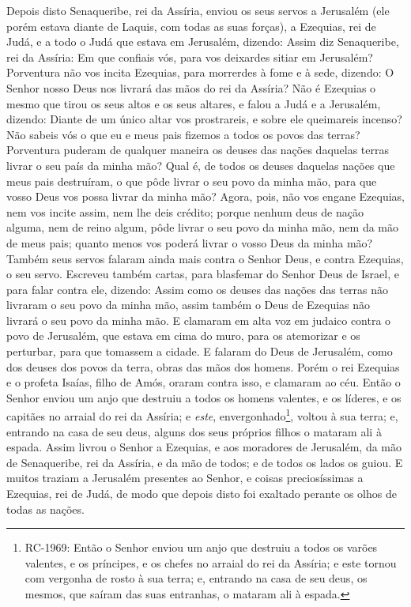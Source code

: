 Depois disto Senaqueribe, rei da Assíria, enviou os seus servos a
Jerusalém (ele porém estava diante de Laquis, com todas as suas
forças), a Ezequias, rei de Judá, e a todo o Judá que estava em
Jerusalém, dizendo: Assim diz Senaqueribe, rei da Assíria: Em
que confiais vós, para vos deixardes sitiar em Jerusalém?
Porventura não vos incita Ezequias, para morrerdes à fome e à
sede, dizendo: O Senhor nosso Deus nos livrará das mãos do rei da
Assíria? Não é Ezequias o mesmo que tirou os seus altos e os
seus altares, e falou a Judá e a Jerusalém, dizendo: Diante de um
único altar vos prostrareis, e sobre ele queimareis incenso?
Não sabeis vós o que eu e meus pais fizemos a todos os povos
das terras? Porventura puderam de qualquer maneira os deuses das
nações daquelas terras livrar o seu país da minha mão? Qual
é, de todos os deuses daquelas nações que meus pais destruíram, o
que pôde livrar o seu povo da minha mão, para que vosso Deus vos
possa livrar da minha mão? Agora, pois, não vos engane
Ezequias, nem vos incite assim, nem lhe deis crédito; porque nenhum
deus de nação alguma, nem de reino algum, pôde livrar o seu povo da
minha mão, nem da mão de meus pais; quanto menos vos poderá livrar o
vosso Deus da minha mão? Também seus servos falaram ainda
mais contra o Senhor Deus, e contra Ezequias, o seu servo.
Escreveu também cartas, para blasfemar do Senhor Deus de
Israel, e para falar contra ele, dizendo: Assim como os deuses das
nações das terras não livraram o seu povo da minha mão, assim também
o Deus de Ezequias não livrará o seu povo da minha mão. E
clamaram em alta voz em judaico contra o povo de Jerusalém, que
estava em cima do muro, para os atemorizar e os perturbar, para que
tomassem a cidade. E falaram do Deus de Jerusalém, como dos
deuses dos povos da terra, obras das mãos dos homens. Porém o
rei Ezequias e o profeta Isaías, filho de Amós, oraram contra isso,
e clamaram ao céu. Então o Senhor enviou um anjo que destruiu
a todos os homens valentes, e os líderes, e os capitães no arraial
do rei da Assíria; e \emph{este}, envergonhado\footnote{RC-1969:
Então o Senhor enviou um anjo que destruiu a todos os varões
valentes, e os príncipes, e os chefes no arraial do rei da Assíria;
e este tornou com vergonha de rosto à sua terra; e, entrando na casa
de seu deus, os mesmos, que saíram das suas entranhas, o mataram ali
à espada.}, voltou à sua terra; e, entrando na casa de seu deus,
alguns dos seus próprios filhos o mataram ali à espada. Assim
livrou o Senhor a Ezequias, e aos moradores de Jerusalém, da mão de
Senaqueribe, rei da Assíria, e da mão de todos; e de todos os lados
os guiou. E muitos traziam a Jerusalém presentes ao Senhor, e
coisas preciosíssimas a Ezequias, rei de Judá, de modo que depois
disto foi exaltado perante os olhos de todas as nações.

